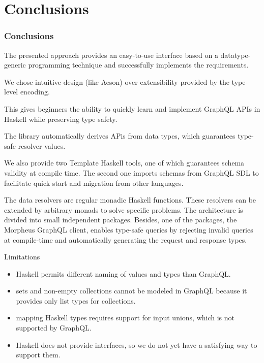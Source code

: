 \section{Conclusions}

\begin{frame}[allowframebreaks]\frametitle{Conclusions}

The presented approach provides an easy-to-use interface based on a datatype-generic programming technique and successfully implements the requirements. 

We chose intuitive design (like Aeson) over extensibility provided by the type-level encoding. 

This gives beginners the ability to quickly learn and implement GraphQL APIs in Haskell while preserving type safety.

The library automatically derives APis from data types, which guarantees type-safe resolver values. 

We also provide two Template Haskell tools, one of which guarantees schema validity at compile time. The second one imports schemas from GraphQL SDL to facilitate quick start and migration from other languages.

The data resolvers are regular monadic Haskell functions. These resolvers can be extended by arbitrary monads to solve specific problems.  The architecture is divided into small independent packages. Besides, one of the packages, the Morpheus GraphQL client, enables type-safe queries by rejecting invalid queries at compile-time and automatically generating the request and response types.
    
Limitations

\begin{itemize}
    \item Haskell permits different naming of values and types than GraphQL. 
    \item sets and non-empty collections cannot be modeled in GraphQL because it provides only list types for collections. 
    \item mapping Haskell types requires support for input unions, which is not supported by GraphQL. 
    \item Haskell does not provide interfaces, so we do not yet have a satisfying way to support them. 
\end{itemize}

\end{frame}



  

